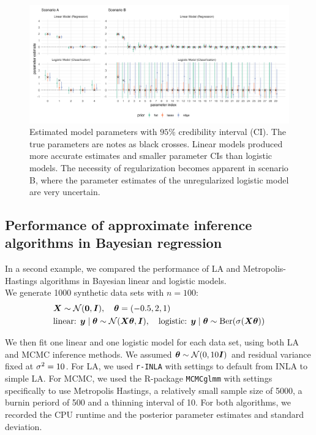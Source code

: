 \begin{figure}[htbp]
    \centering
    \includegraphics[width=\linewidth]{../figures/reg_all.png}
    \caption{Estimated model parameters with $95\%$ credibility interval (CI). The true parameters are notes as black crosses. Linear models produced more accurate estimates and smaller parameter CIs than logistic models. The necessity of regularization becomes apparent in scenario B, where the parameter estimates of the unregularized logistic model are very uncertain.}
    \label{fig:reg-params}
\end{figure}

\subsection{Performance of approximate inference algorithms in Bayesian regression}

In a second example, we compared the performance of LA and Metropolis-Hastings algorithms in Bayesian linear and logistic models.\\

We generate 1000 synthetic data sets with $n=100$:
\begin{equation*}
    \begin{aligned}
        &\bm{X} \sim \mathcal{N}(\bm{0}, \bm{I}), \quad \bm{\theta} = (-0.5, 2, 1)\\
        &\text{linear: } \bm{y} \mid \bm{\theta} \sim \mathcal{N}(\bm{X} \bm{\theta}, \bm{I}),\quad \text{logistic: } \bm{y} \mid \bm{\theta} \sim \text{Ber}(\sigma(\bm{X} \bm{\theta}))
    \end{aligned}
\end{equation*}

We then fit one linear and one logistic model for each data set, using both LA and MCMC inference methods.
We assumed $\bm{\theta} \sim \mathcal{N}(0, 10 \bm{I})$ and residual variance fixed at $\sigma^2 = 10$. For LA, we used \texttt{r-INLA} with settings to default from INLA to simple LA.
For MCMC, we used the R-package \texttt{MCMCglmm} with settings specifically to use Metropolis Hastings, a relatively small sample size of 5000, a burnin periord of 500 and a thinning interval of 10. For both algorithms, we recorded the CPU runtime and the posterior parameter estimates and standard deviation.\\

